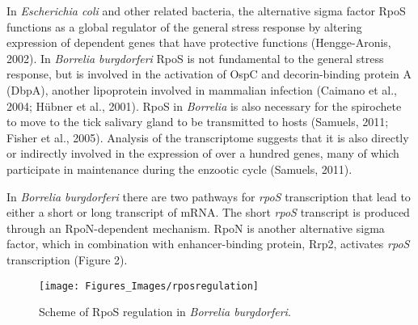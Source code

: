 \documentclass[12pt,twoside]{reedthesis}
\begin{document}
	 In \textit{Escherichia coli} and other related bacteria, the alternative sigma factor RpoS functions as a global regulator of the general stress response by altering expression of dependent genes that have protective functions (Hengge-Aronis, 2002). In \textit{Borrelia burgdorferi} RpoS is not fundamental to the general stress response, but is involved in the activation of OspC and decorin-binding protein A (DbpA), another lipoprotein involved in mammalian infection (Caimano et al., 2004; H\"ubner et al., 2001). RpoS in \textit{Borrelia} is also necessary for the spirochete to move to the tick salivary gland to be transmitted to hosts (Samuels, 2011; Fisher et al., 2005). Analysis of the transcriptome suggests
	 that it is also directly or indirectly involved in the expression of over a hundred genes, many of which participate in maintenance during the enzootic cycle  (Samuels, 2011). 
	 
		In \textit{Borrelia burgdorferi} there are two pathways for \textit{rpoS} transcription that lead to either a short or long transcript of mRNA. The short \textit{rpoS} transcript is produced through an RpoN-dependent mechanism. RpoN is another alternative sigma factor, which in combination with enhancer-binding protein, Rrp2, activates \textit{rpoS} transcription (Figure 2). 
		
		
				\begin{figure}[h]
					
					\centering
					\texttt{[image: Figures\_Images/rposregulation]}
					\caption[Scheme of RpoS regulation in \textit{Borrelia burgdorferi}]{Scheme of RpoS regulation in \textit{Borrelia burgdorferi}.}
					\label{RpoSReg}
				\end{figure}
				
\end{document}
